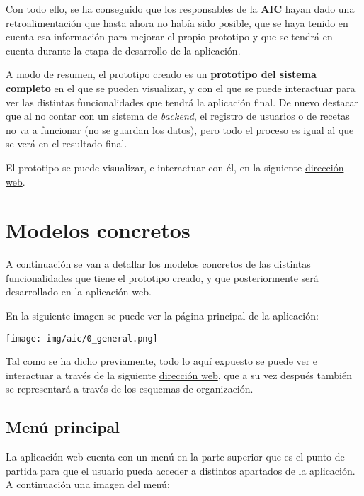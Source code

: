 \documentclass{\ClassPath/viu-tfm-template}
\begin{document}
Con todo ello, se ha conseguido que los responsables de la \textbf{AIC} hayan dado una retroalimentación que hasta ahora no había sido posible, que se haya tenido en cuenta esa información para mejorar el propio prototipo y que se tendrá en cuenta durante la etapa de desarrollo de la aplicación.

A modo de resumen, el prototipo creado es un \textbf{prototipo del sistema completo} en el que se pueden visualizar, y con el que se puede interactuar para ver las distintas funcionalidades que tendrá la aplicación final. De nuevo destacar que al no contar con un sistema de \textit{backend}, el registro de usuarios o de recetas no va a funcionar (no se guardan los datos), pero todo el proceso es igual al que se verá en el resultado final.

El prototipo se puede visualizar, e interactuar con él, en la siguiente  \href{https://yuki.github.io/VIU_03MASW/preview.html}{dirección web}.


\chapter{Modelos concretos}

A continuación se van a detallar los modelos concretos de las distintas funcionalidades que tiene el prototipo creado, y que posteriormente será desarrollado en la aplicación web.

En la siguiente imagen se puede ver la página principal de la aplicación:

\begin{center}
    \vspace{-10pt}
    \texttt{[image: img/aic/0\_general.png]}
    \vspace{-20pt}
\end{center}

Tal como se ha dicho previamente, todo lo aquí expuesto se puede ver e interactuar a través de la siguiente \href{https://yuki.github.io/VIU_03MASW/preview.html}{dirección web}, que a su vez después también se representará a través de los esquemas de organización.

\hypertarget{menu_principal}{}
\section{Menú principal}

La aplicación web cuenta con un menú en la parte superior que es el punto de partida para que el usuario pueda acceder a distintos apartados de la aplicación. A continuación una imagen del menú:
\end{document}
